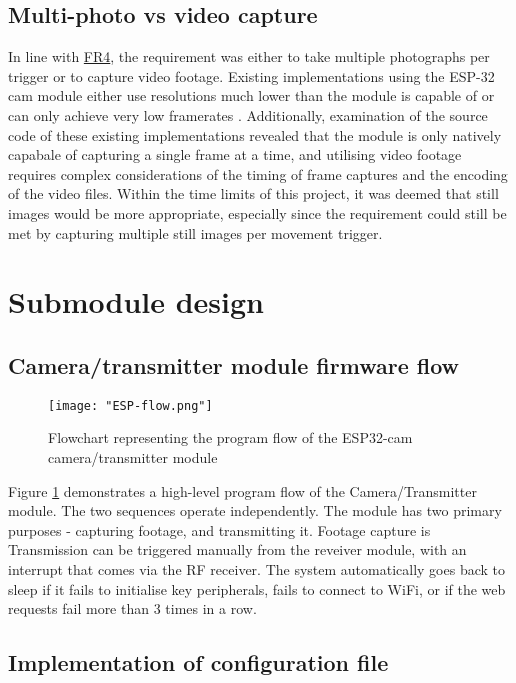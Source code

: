 \documentclass[class=report,11pt,crop=false]{standalone}
\begin{document}
\subsection{Multi-photo vs video capture}

In line with \hyperlink{tab:firmware-requirements}{FR4}, the requirement was either to take multiple photographs per trigger or to capture video footage. Existing implementations using the ESP-32 cam module either use resolutions much lower than the module is capable of or can only achieve very low framerates \cite{zahary2019esp}. Additionally, examination of the source code of these existing implementations revealed that the module is only natively capabale of capturing a single frame at a time, and utilising video footage requires complex considerations of the timing of frame captures and the encoding of the video files. Within the time limits of this project, it was deemed that still images would be more appropriate, especially since the requirement could still be met by capturing multiple still images per movement trigger. 

\section{Submodule design} \label{s:firmware-design-process}

\subsection{Camera/transmitter module firmware flow} \label{ss:espflow}

\begin{figure}[ht]
    \centering
    \texttt{[image: "ESP-flow.png"]}
    \caption{Flowchart representing the program flow of the ESP32-cam camera/transmitter module}
    \label{fig:espflow}
\end{figure}

Figure \ref{fig:espflow} demonstrates a high-level program flow of the Camera/Transmitter module. The two sequences operate independently. The module has two primary purposes - capturing footage, and transmitting it. Footage capture is Transmission can be triggered manually from the reveiver module, with an interrupt that comes via the RF receiver. The system automatically goes back to sleep if it fails to initialise key peripherals, fails to connect to WiFi, or if the web requests fail more than 3 times in a row.

\subsection{Implementation of configuration file}
\end{document}
